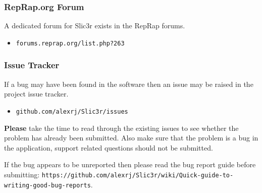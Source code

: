 \subsubsection{RepRap.org Forum} %
\label{sub:reprap_org_forum}


A dedicated forum for Slic3r exists in the RepRap forums.
\begin{itemize}
    \item \texttt{forums.reprap.org/list.php?263}
\end{itemize}


\subsubsection{Issue Tracker} %
\label{sub:issue_tracker}

If a bug may have been found in the software then an issue may be raised in the project issue tracker.

\begin{itemize}
    \item \texttt{github.com/alexrj/Slic3r/issues}
\end{itemize}

\textbf{Please} take the time to read through the existing issues to see whether the problem has already been submitted.  Also make sure that the problem is a bug in the application, support related questions should not be submitted.

If the bug appears to be unreported then please read the bug report guide before submitting: \texttt{https://github.com/alexrj/Slic3r/wiki/Quick-guide-to-writing-good-bug-reports}.


